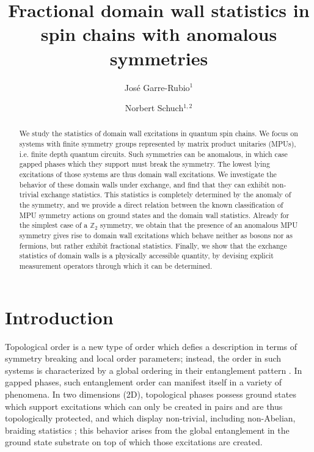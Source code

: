 \documentclass[aps,pra,export,nofootinbib]{revtex4-2}
\begin{document}
\title{Fractional domain wall statistics in spin chains with anomalous symmetries}

\author{ Jos\'e Garre-Rubio$^1$}


\author{Norbert Schuch$^{1,2}$}

\begin{abstract}
We study the statistics of domain wall excitations in quantum spin chains. 
We focus on systems with finite symmetry groups represented by  matrix product unitaries
(MPUs), i.e. finite depth quantum circuits. Such symmetries can be anomalous, in which case gapped phases which they support must break the symmetry.
%
The lowest lying excitations of those systems are thus domain wall excitations.
We investigate the behavior of these domain walls under exchange, and find that
they can exhibit non-trivial exchange statistics. This statistics is completely
determined by the anomaly of the symmetry, and we provide a direct relation between the known classification of MPU symmetry actions on ground states and the domain wall statistics. 
%
Already for the simplest case of a $\mathbb Z_2$ symmetry,
we obtain that the presence of an anomalous MPU symmetry gives rise 
to domain wall excitations which behave neither as bosons nor as fermions, but rather exhibit fractional statistics. 
%
Finally, we show that the exchange statistics of domain walls is a physically
accessible quantity, by devising explicit measurement operators through which it can be determined.
\end{abstract}

\maketitle


\section{Introduction}


Topological order is a new type of order which defies a description in terms of symmetry breaking and local order parameters; instead, the order in such systems is characterized by a global ordering in their entanglement pattern \cite{Wen90A}. In gapped phases, such entanglement order can manifest itself in a variety of phenomena. In two dimensions (2D), topological phases possess ground states which support excitations which can only be created
in pairs and are thus topologically protected, and which display non-trivial, including non-Abelian, braiding statistics \cite{Kitaev03,Levin05}; this behavior
arises from the global entanglement in the ground state substrate on top of which those excitations are created.  
\end{document}
